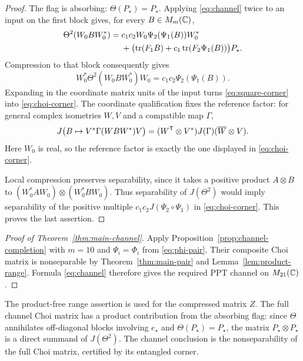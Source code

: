 \begin{proof}
The flag is absorbing: $\Theta(P_\star)=P_\star$.  Applying
\eqref{eq:channel} twice to an input on the first block gives, for every
$B\in M_{m}(\mathbb C)$,
\begin{align*}
 \Theta^2(W_0BW_0^*)
 ={}&c_1c_2W_0\Psi_2(\Psi_1(B))W_0^*\\
 &+\bigl(\operatorname{tr}(F_1B)+c_1\operatorname{tr}(F_2\Psi_1(B))\bigr)P_\star .
\end{align*}
Compression to that block consequently gives
\begin{equation}\label{eq:square-corner}
 W_0^*\Theta^2(W_0BW_0^*)W_0
       =c_1c_2\Psi_2(\Psi_1(B)).
\end{equation}
Expanding in the coordinate matrix units of the input turns
\eqref{eq:square-corner} into \eqref{eq:choi-corner}.  The coordinate
qualification fixes the reference factor: for general complex isometries
$W,V$ and a compatible map $\Gamma$,
\[
 J\bigl(B\mapsto V^*\Gamma(WBW^*)V\bigr)
   =(W^{\mathsf T}\otimes V^*)J(\Gamma)(\overline W\otimes V).
\]
Here $W_0$ is real, so the reference factor is exactly the one displayed in
\eqref{eq:choi-corner}.

Local compression preserves separability, since it takes a positive product
$A\otimes B$ to
$(W_0^*AW_0)\otimes(W_0^*BW_0)$.  Thus separability of $J(\Theta^2)$
would imply separability of the positive multiple
$c_1c_2J(\Psi_2\circ\Psi_1)$ in \eqref{eq:choi-corner}.  This proves the
last assertion.
\end{proof}

\begin{proof}[Proof of Theorem~\ref{thm:main-channel}]
Apply Proposition~\ref{prop:channel-completion} with $m=10$ and
$\Psi_i=\Phi_i$ from \eqref{eq:phi-pair}.  Their composite Choi matrix is
nonseparable by Theorem~\ref{thm:main-pair} and
Lemma~\ref{lem:product-range}.  Formula \eqref{eq:channel} therefore gives
the required PPT channel on $M_{21}(\mathbb C)$.
\end{proof}

The product-free range assertion is used for the compressed matrix $Z$.
The full channel Choi matrix has a product contribution from the absorbing
flag: since $\Theta$ annihilates off-diagonal blocks involving $e_\star$ and
$\Theta(P_\star)=P_\star$, the matrix $P_\star\otimes P_\star$ is a direct
summand of $J(\Theta^2)$.  The channel conclusion is the nonseparability of
the full Choi matrix, certified by its entangled corner.
